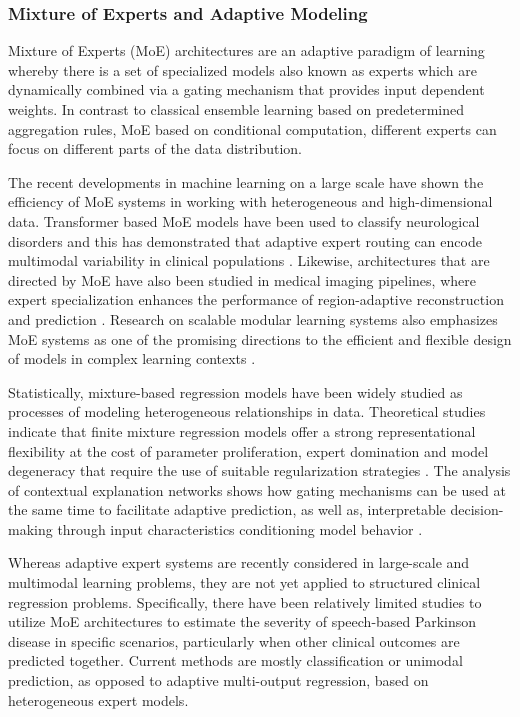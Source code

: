 \documentclass{customIEEEsingle}
\begin{document}
	\subsubsection{Mixture of Experts and Adaptive Modeling}
	
	Mixture of Experts (MoE) architectures are an adaptive paradigm of learning whereby there is a set of specialized models also known as experts which are dynamically combined via a gating mechanism that provides input dependent weights. In contrast to classical ensemble learning based on predetermined aggregation rules, MoE based on conditional computation, different experts can focus on different parts of the data distribution.
	
	The recent developments in machine learning on a large scale have shown the efficiency of MoE systems in working with heterogeneous and high-dimensional data. Transformer based MoE models have been used to classify neurological disorders and this has demonstrated that adaptive expert routing can encode multimodal variability in clinical populations \cite{raza-2025}. Likewise, architectures that are directed by MoE have also been studied in medical imaging pipelines, where expert specialization enhances the performance of region-adaptive reconstruction and prediction \cite{wang-2025}. Research on scalable modular learning systems also emphasizes MoE systems as one of the promising directions to the efficient and flexible design of models in complex learning contexts \cite{hadia-2025}.
	
	Statistically, mixture-based regression models have been widely studied as processes of modeling heterogeneous relationships in data. Theoretical studies indicate that finite mixture regression models offer a strong representational flexibility at the cost of parameter proliferation, expert domination and model degeneracy that require the use of suitable regularization strategies \cite{khalili-2013}. The analysis of contextual explanation networks shows how gating mechanisms can be used at the same time to facilitate adaptive prediction, as well as, interpretable decision-making through input characteristics conditioning model behavior \cite{al-shedivat-2020}.
	
	Whereas adaptive expert systems are recently considered in large-scale and multimodal learning problems, they are not yet applied to structured clinical regression problems. Specifically, there have been relatively limited studies to utilize MoE architectures to estimate the severity of speech-based Parkinson disease in specific scenarios, particularly when other clinical outcomes are predicted together. Current methods are mostly classification or unimodal prediction, as opposed to adaptive multi-output regression, based on heterogeneous expert models.
	
\end{document}
